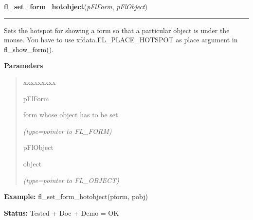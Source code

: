     \label{xformslib:flbasic:fl_set_form_hotobject}

    \vspace{0.5ex}

\hspace{.8\funcindent}\begin{boxedminipage}{\funcwidth}

    \raggedright \textbf{fl\_set\_form\_hotobject}(\textit{pFlForm}, \textit{pFlObject})

    \vspace{-1.5ex}

    \rule{\textwidth}{0.5\fboxrule}
\setlength{\parskip}{2ex}
    Sets the hotspot for showing a form so that a particular object is 
    under the mouse. You have to use xfdata.FL\_PLACE\_HOTSPOT as place 
    argument in fl\_show\_form().

\setlength{\parskip}{1ex}
      \textbf{Parameters}
      \vspace{-1ex}

      \begin{quote}
        \begin{Ventry}{xxxxxxxxx}

          \item[pFlForm]

          form whose object has to be set

            {\it (type=pointer to FL\_FORM)}

          \item[pFlObject]

          object

            {\it (type=pointer to FL\_OBJECT)}

        \end{Ventry}

      \end{quote}

\textbf{Example:} fl\_set\_form\_hotobject(pform, pobj)



\textbf{Status:} Tested + Doc + Demo = OK



    \end{boxedminipage}

    \label{xformslib:flbasic:fl_set_form_minsize}

